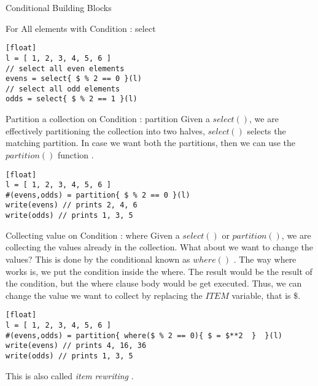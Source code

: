 \begin{section}{Conditional Building Blocks}
\begin{subsection}{For All elements with Condition : select }
\begin{lstlisting}[style=JexlStyle][float]
l = [ 1, 2, 3, 4, 5, 6 ]
// select all even elements 
evens = select{ $ % 2 == 0 }(l)
// select all odd elements 
odds = select{ $ % 2 == 1 }(l) 
\end{lstlisting}

\end{subsection}

\begin{subsection}{Partition a collection on Condition : partition }
Given a $select()$, we are effectively partitioning the collection into two halves,
$select()$ selects the matching partition. In case we want both the partitions, then 
we can use the $partition()$ function .

\begin{lstlisting}[style=JexlStyle][float]
l = [ 1, 2, 3, 4, 5, 6 ]
#(evens,odds) = partition{ $ % 2 == 0 }(l)
write(evens) // prints 2, 4, 6 
write(odds) // prints 1, 3, 5
\end{lstlisting}
\end{subsection}

\begin{subsection}{Collecting value on Condition : where }
Given a $select()$ or $partition()$, we are collecting the values already 
in the collection. What about we want to change the values? 
This is done by the conditional known as $where()$ .
The way where works is, we put the condition inside the where.
The result would be the result of the condition, but the where clause body 
would be get executed. Thus, we can change the value we want to collect
by replacing the $ITEM$ variable, that is $\$$.

\begin{lstlisting}[style=JexlStyle][float]
l = [ 1, 2, 3, 4, 5, 6 ]
#(evens,odds) = partition{ where($ % 2 == 0){ $ = $**2  }  }(l)
write(evens) // prints 4, 16, 36 
write(odds) // prints 1, 3, 5
\end{lstlisting}

This is also called \emph{item rewriting} .
\end{subsection}

\end{section}


